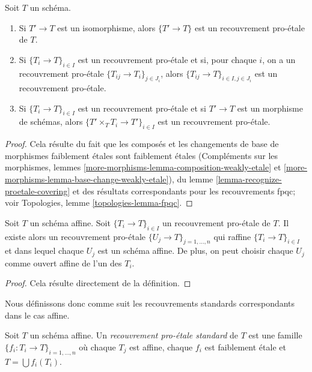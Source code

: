 \begin{lemma}
\label{lemma-proetale}
Soit $T$ un schéma.
\begin{enumerate}
\item Si $T' \to T$ est un isomorphisme, alors $\{T' \to T\}$
est un recouvrement pro-\'etale de $T$.
\item Si $\{T_i \to T\}_{i\in I}$ est un recouvrement pro-\'etale et si, pour chaque
$i$, on a un recouvrement pro-\'etale $\{T_{ij} \to T_i\}_{j\in J_i}$, alors
$\{T_{ij} \to T\}_{i \in I, j\in J_i}$ est un recouvrement pro-\'etale.
\item Si $\{T_i \to T\}_{i\in I}$ est un recouvrement pro-\'etale
et si $T' \to T$ est un morphisme de schémas, alors
$\{T' \times_T T_i \to T'\}_{i\in I}$ est un recouvrement pro-\'etale.
\end{enumerate}
\end{lemma}

\begin{proof}
Cela résulte du fait que les composés et les changements de base
de morphismes faiblement \'etales sont faiblement \'etales
(Compléments sur les morphismes, lemmes
\ref{more-morphisms-lemma-composition-weakly-etale} et
\ref{more-morphisms-lemma-base-change-weakly-etale}),
du lemme \ref{lemma-recognize-proetale-covering} et
des résultats correspondants pour les recouvrements fpqc; voir
Topologies, lemme \ref{topologies-lemma-fpqc}.
\end{proof}

\begin{lemma}
\label{lemma-proetale-affine}
Soit $T$ un schéma affine. Soit $\{T_i \to T\}_{i \in I}$ un recouvrement pro-\'etale
de $T$. Il existe alors un recouvrement pro-\'etale
$\{U_j \to T\}_{j = 1, \ldots, n}$ qui raffine
$\{T_i \to T\}_{i \in I}$ et dans lequel chaque $U_j$ est un schéma
affine. De plus, on peut choisir chaque $U_j$ comme ouvert affine
de l'un des $T_i$.
\end{lemma}

\begin{proof}
Cela résulte directement de la définition.
\end{proof}

\noindent
Nous définissons donc comme suit les recouvrements standards correspondants dans le cas affine.

\begin{definition}
\label{definition-standard-proetale}
Soit $T$ un schéma affine. Un {\it recouvrement pro-\'etale standard}
de $T$ est une famille $\{f_i : T_i \to T\}_{i = 1, \ldots, n}$
où chaque $T_j$ est affine, chaque $f_i$ est faiblement \'etale et
$T = \bigcup f_i(T_i)$.
\end{definition}

